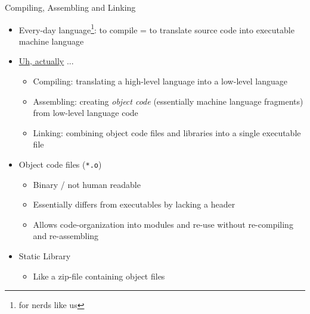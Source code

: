 \begin{frame}{Compiling, Assembling and Linking}
%
\begin{itemize}
\item Every-day language\footnote{for nerds like us}: to compile = to translate source code into executable machine language
\item \href{https://knowyourmeme.com/memes/ackchyually-actually-guy}{Uh, actually} ...
	\begin{itemize}
	\item Compiling: translating a high-level language into a low-level language
	\item Assembling: creating \emph{object code} (essentially machine language fragments) from low-level language code
	\item Linking: combining object code files and libraries into a single executable file
	\end{itemize}
\item Object code files (\texttt{*.o})
	\begin{itemize}
	\item Binary / not human readable
	\item Essentially differs from executables by lacking a header
	\item Allows code-organization into modules and re-use without re-compiling and re-assembling
	\end{itemize}
\item Static Library
	\begin{itemize}
	\item Like a zip-file containing object files
	\end{itemize}
\end{itemize}
%
\end{frame}


